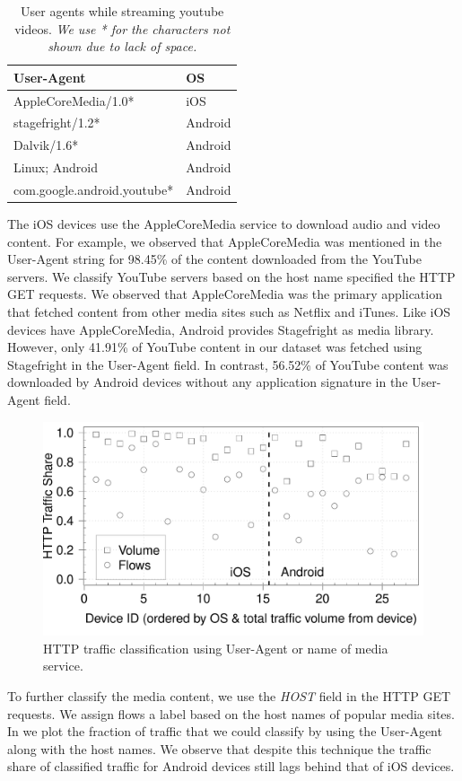 \begin{table}
\begin{tabular}{|l|l|}
\hline
User-Agent & OS \tabularnewline
\hline
AppleCoreMedia/1.0* & iOS \tabularnewline
stagefright/1.2* & Android \tabularnewline
Dalvik/1.6* & Android \tabularnewline
Linux; Android & Android \tabularnewline
com.google.android.youtube* & Android \tabularnewline
\hline
\end{tabular}
\caption{User agents while streaming youtube videos. \emph{We use * for the characters not shown due to lack of space.}}
\label{tab:top-user-agents}
\end{table}

The iOS devices use the AppleCoreMedia service to download audio and video content. 
For example, we observed that AppleCoreMedia was mentioned in the User-Agent string for 98.45\% of the content downloaded from the YouTube servers. 
We classify YouTube servers based on the host name specified the HTTP GET requests. 
We observed that AppleCoreMedia was the primary application that fetched content from other media sites such as Netflix and iTunes.
Like iOS devices have AppleCoreMedia, Android provides Stagefright\cite{stagefright} as media library.
However, only 41.91\% of YouTube content in our dataset was fetched using Stagefright in the User-Agent field. 
In contrast, 56.52\% of YouTube content was downloaded by Android devices without any application signature in the User-Agent field.  


\begin{figure}
\includegraphics[width=\columnwidth]{plots/appusage_someappservicesig_traffic.pdf}
\caption{HTTP traffic classification using User-Agent or name of media service.}
\label{fig:http-classification-app-service}
\end{figure}
To further classify the media content, we use the \emph{HOST} field in the HTTP GET requests.
We assign flows a label based on the host names of popular media sites. 
In  we plot the fraction of traffic that we could classify by using the User-Agent along with the host names. 
We observe that despite this technique the traffic share of classified traffic for Android devices still lags behind that of iOS devices. 


